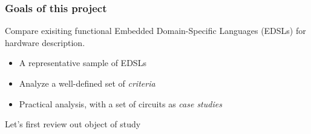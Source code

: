         \begin{frame}
            \frametitle{Goals of this project}

            \par{Compare exisiting functional Embedded Domain-Specific Languages (EDSLs) for hardware description.}
            \vspace{0.2cm}
            \begin{itemize}
                \item A representative sample of EDSLs
                \item Analyze a well-defined set of \emph{criteria}
                \item Practical analysis, with a set of circuits as \emph{case studies}
            \end{itemize}

            \pause
            \vspace{0.4cm}
            \par{Let's first review out object of study}

        \end{frame}


